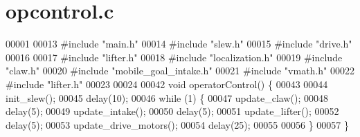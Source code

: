 \section{opcontrol.\+c}
\label{opcontrol_8c_source}

\begin{DoxyCode}
00001 
00013 \textcolor{preprocessor}{#include "main.h"}
00014 \textcolor{preprocessor}{#include "slew.h"}
00015 \textcolor{preprocessor}{#include "drive.h"}
00016 
00017 \textcolor{preprocessor}{#include "lifter.h"}
00018 \textcolor{preprocessor}{#include "localization.h"}
00019 \textcolor{preprocessor}{#include "claw.h"}
00020 \textcolor{preprocessor}{#include "mobile_goal_intake.h"}
00021 \textcolor{preprocessor}{#include "vmath.h"}
00022 \textcolor{preprocessor}{#include "lifter.h"}
00023 
00024 
00042 \textcolor{keywordtype}{void} operatorControl() \{
00043 
00044     init_slew();
00045     delay(10);
00046     \textcolor{keywordflow}{while} (1) \{
00047         update_claw();
00048         delay(5);
00049         update_intake();
00050         delay(5);
00051         update_lifter();
00052         delay(5);
00053         update_drive_motors();
00054         delay(25);
00055 
00056     \}
00057 \}
\end{DoxyCode}
